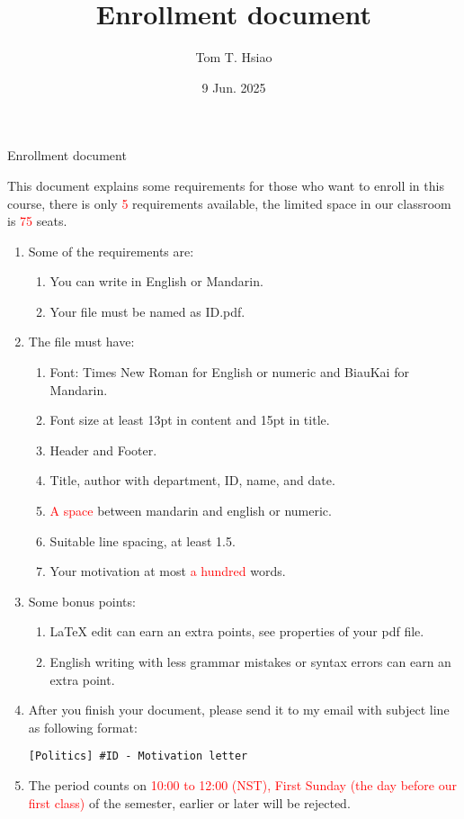 \documentclass{article}
\title{Enrollment document}
\author{Tom T. Hsiao}
\date{9 Jun. 2025}
\begin{document}
\thispagestyle{fancy}
\begin{center}
\fontsize{16pt}{16pt}\selectfont Enrollment document
\end{center}
\fontsize{14pt}{14pt}\selectfont
This document explains some requirements for those who want to enroll in this course, there is only \textcolor{red}{5} requirements available, the limited space in our classroom is \textcolor{red}{75} seats. \\
\begin{enumerate}
\item Some of the requirements are:
\begin{enumerate}
\item You can write in English or Mandarin.
\item Your file must be named as ID.pdf.
\end{enumerate}
\item The file must have:
\begin{enumerate}
\item Font: Times New Roman for English or numeric and BiauKai for Mandarin.
\item Font size at least 13pt in content and 15pt in title.
\item Header and Footer.
\item Title, author with department, ID, name, and date.
\item \textcolor{red}{A space} between mandarin and english or numeric.
\item Suitable line spacing, at least 1.5.
\item Your motivation at most \textcolor{red}{a hundred} words.
\end{enumerate}
\item Some bonus points:
\begin{enumerate}
\item LaTeX edit can earn an extra points, see properties of your pdf file.
\item English writing with less grammar mistakes or syntax errors can earn an extra point.
\end{enumerate}
\item After you finish your document, please send it to my email with subject line as following format:
\begin{verbatim}
[Politics] #ID - Motivation letter
\end{verbatim}
\item The period counts on \textcolor{red}{10:00 to 12:00 (NST), First Sunday (the day before our first class)} of the semester, earlier or later will be rejected.
\end{enumerate}
\end{document}

